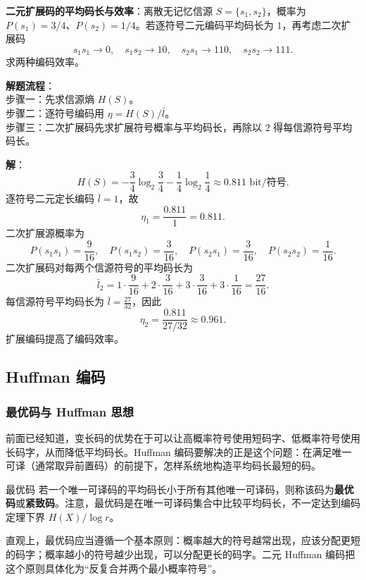 \begin{example}
\label{ex:ch5-binary-extension-code-efficiency}
\textbf{二元扩展码的平均码长与效率}：离散无记忆信源 $S=\{s_1,s_2\}$，概率为 $P(s_1)=3/4$、$P(s_2)=1/4$。若逐符号二元编码平均码长为 $1$，再考虑二次扩展码
\[
s_1s_1\to0,
\quad s_1s_2\to10,
\quad s_2s_1\to110,
\quad s_2s_2\to111.
\]
求两种编码效率。

\noindent \textbf{解题流程}：\\[2pt]
步骤一：先求信源熵 $H(S)$。\\
步骤二：逐符号编码用 $\eta=H(S)/\bar l$。\\
步骤三：二次扩展码先求扩展符号概率与平均码长，再除以 2 得每信源符号平均码长。

\textbf{解}：
\[
H(S)=-\frac34\log_2\frac34-\frac14\log_2\frac14\approx0.811\text{ bit/符号}.
\]
逐符号二元定长编码 $\bar l=1$，故
\[
\eta_1=\frac{0.811}{1}=0.811.
\]
二次扩展源概率为
\[
P(s_1s_1)=\frac9{16},\quad P(s_1s_2)=\frac3{16},\quad
P(s_2s_1)=\frac3{16},\quad P(s_2s_2)=\frac1{16}.
\]
二次扩展码对每两个信源符号的平均码长为
\[
\bar l_2=1\cdot\frac9{16}+2\cdot\frac3{16}+3\cdot\frac3{16}+3\cdot\frac1{16}
=\frac{27}{16}.
\]
每信源符号平均码长为 $\bar l=\frac{27}{32}$，因此
\[
\eta_2=\frac{0.811}{27/32}\approx0.961.
\]
扩展编码提高了编码效率。
\end{example}

\subsection{Huffman 编码}

\subsubsection{最优码与 Huffman 思想}

前面已经知道，变长码的优势在于可以让高概率符号使用短码字、低概率符号使用长码字，从而降低平均码长。Huffman 编码要解决的正是这个问题：在满足唯一可译（通常取异前置码）的前提下，怎样系统地构造平均码长最短的码。

\begin{definitionBox}{最优码}
若一个唯一可译码的平均码长小于所有其他唯一可译码，则称该码为\textbf{最优码}或\textbf{紧致码}。注意，最优码是在唯一可译码集合中比较平均码长，不一定达到编码定理下界 $H(X)/\log r$。
\end{definitionBox}

直观上，最优码应当遵循一个基本原则：概率越大的符号越常出现，应该分配更短的码字；概率越小的符号越少出现，可以分配更长的码字。二元 Huffman 编码把这个原则具体化为“反复合并两个最小概率符号”。

